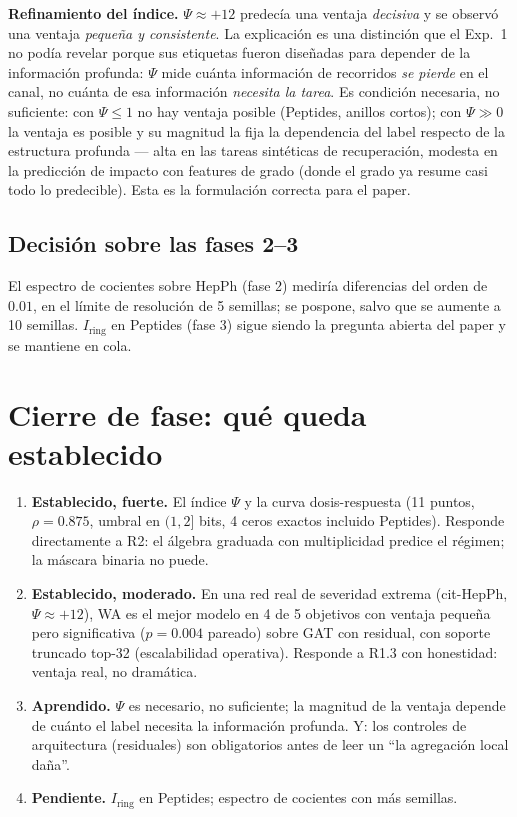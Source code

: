 \documentclass[11pt]{article}
\begin{document}
\textbf{Refinamiento del \'indice.} $\Psi\approx+12$ predec\'ia una ventaja
\emph{decisiva} y se observ\'o una ventaja \emph{peque\~na y consistente}.
La explicaci\'on es una distinci\'on que el Exp.~1 no pod\'ia revelar
porque sus etiquetas fueron dise\~nadas para depender de la informaci\'on
profunda: $\Psi$ mide cu\'anta informaci\'on de recorridos \emph{se pierde}
en el canal, no cu\'anta de esa informaci\'on \emph{necesita la tarea}. Es
condici\'on necesaria, no suficiente: con $\Psi\le1$ no hay ventaja
posible (Peptides, anillos cortos); con $\Psi\gg0$ la ventaja es posible y
su magnitud la fija la dependencia del label respecto de la estructura
profunda --- alta en las tareas sint\'eticas de recuperaci\'on, modesta en
la predicci\'on de impacto con features de grado (donde el grado ya resume
casi todo lo predecible). Esta es la formulaci\'on correcta para el paper.

\subsection{Decisi\'on sobre las fases 2--3}

El espectro de cocientes sobre HepPh (fase 2) medir\'ia diferencias del
orden de $0.01$, en el l\'imite de resoluci\'on de 5 semillas; se pospone,
salvo que se aumente a 10 semillas. $I_{\mathrm{ring}}$ en Peptides (fase 3)
sigue siendo la pregunta abierta del paper y se mantiene en cola.

\section{Cierre de fase: qu\'e queda establecido}

\begin{enumerate}
  \item \textbf{Establecido, fuerte.} El \'indice $\Psi$ y la curva
  dosis-respuesta (11 puntos, $\rho=0.875$, umbral en $(1,2]$ bits, 4 ceros
  exactos incluido Peptides). Responde directamente a R2: el \'algebra
  graduada con multiplicidad predice el r\'egimen; la m\'ascara binaria no
  puede.
  \item \textbf{Establecido, moderado.} En una red real de severidad
  extrema (cit-HepPh, $\Psi\approx+12$), WA es el mejor modelo en 4 de 5
  objetivos con ventaja peque\~na pero significativa ($p=0.004$ pareado)
  sobre GAT con residual, con soporte truncado top-32 (escalabilidad
  operativa). Responde a R1.3 con honestidad: ventaja real, no dram\'atica.
  \item \textbf{Aprendido.} $\Psi$ es necesario, no suficiente; la
  magnitud de la ventaja depende de cu\'anto el label necesita la
  informaci\'on profunda. Y: los controles de arquitectura (residuales)
  son obligatorios antes de leer un ``la agregaci\'on local da\~na''.
  \item \textbf{Pendiente.} $I_{\mathrm{ring}}$ en Peptides; espectro de
  cocientes con m\'as semillas.
\end{enumerate}
\end{document}
